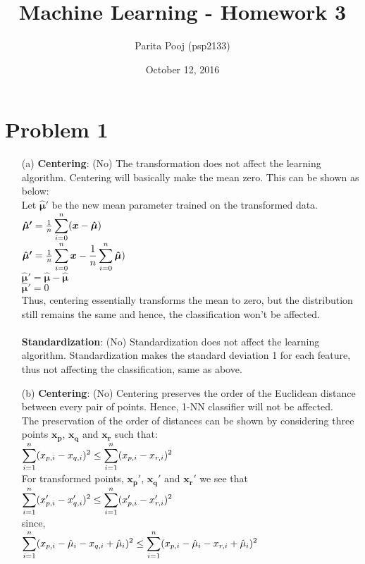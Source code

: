 \documentclass[fleqn]{article}
\title{Machine Learning - Homework 3}
\author{Parita Pooj (psp2133)}
\date{October 12, 2016}
\begin{document}
\maketitle
\setcounter{secnumdepth}{0}
\section{Problem 1}{}
\begin{itemize}
        \item[(a)]
		\textbf{Centering}: (No) The transformation does not affect the learning algorithm.
		Centering will basically make the mean zero. This can be shown as below:\\
		Let $\bm{\hat{\mu}'}$ be the new mean parameter trained on the transformed data.
		$ \bm{\hat{\mu}'} = \frac{1}{n} \smashoperator{\sum_{i = 0}^{n}} (\bm{x} - \bm{\hat{\mu}})$ \\
		$ \bm{\hat{\mu}'} = \frac{1}{n} \smashoperator{\sum_{i = 0}^{n}} \bm{x} 
		                  - \frac{1}{n} \smashoperator{\sum_{i = 0}^{n}} \bm{\hat{\mu}})$ \\
		$ \bm{\hat{\mu}'} = \bm{\hat{\mu}} - \bm{\hat{\mu}} $ \\
		$ \bm{\hat{\mu}'} = 0 $\\
		Thus, centering essentially transforms the mean to zero, but the distribution still remains the same and hence, the classification won't be affected.\\
		\\
		\textbf{Standardization}: (No) Standardization does not affect the learning algorithm.
		Standardization makes the standard deviation 1 for each feature, thus not affecting the classification, same as above.\\

        \item[(b)]
		\textbf{Centering}: (No) Centering preserves the order of the Euclidean distance between every pair of points.
		Hence, 1-NN classifier will not be affected.\\
		The preservation of the order of distances can be shown by considering three points $\bm{x_p}$, $\bm{x_q}$ and $\bm{x_r}$ such that:\\
		$ \smashoperator{\sum_{i = 1}^{n}} (x_{p,i} - x_{q, i})^2 \leq \smashoperator{\sum_{i = 1}^{n}} (x_{p,i} - x_{r, i})^2 $\\
		For transformed points, $\bm{x_p'}$, $\bm{x_q'}$ and $\bm{x_r'}$ we see that \\
		$ \smashoperator{\sum_{i = 1}^{n}} (x_{p,i}' - x_{q, i}')^2 \leq \smashoperator{\sum_{i = 1}^{n}} (x_{p,i}' - x_{r, i}')^2 $\\
		since, \\
		$ \smashoperator{\sum_{i = 1}^{n}} (x_{p,i} - \hat{\mu}_i - x_{q, i} + \hat{\mu}_i)^2 
			\leq \smashoperator{\sum_{i = 1}^{n}} (x_{p,i} - \hat{\mu}_i - x_{r, i} + \hat{\mu}_i)^2$ \\


\end{itemize}
\end{document}
